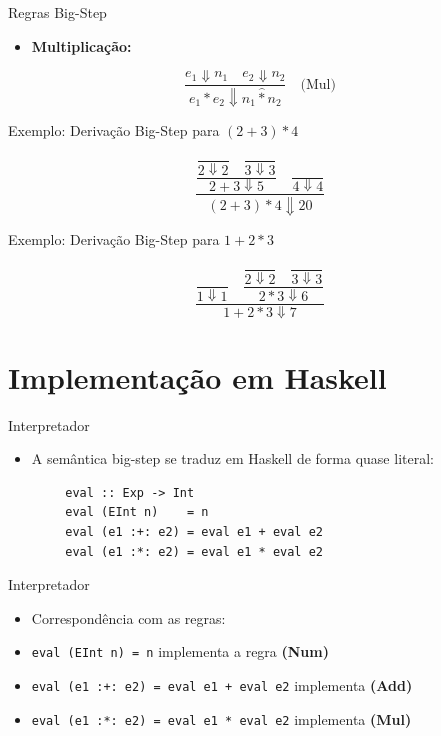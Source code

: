 \begin{frame}{Regras Big-Step}

    \begin{itemize}

        \item
        \textbf{Multiplicação:}
    \end{itemize}

    \[\frac{e_1 \Downarrow n_1 \quad e_2 \Downarrow n_2}{e_1 * e_2 \Downarrow n_1 \mathbin{\hat{*}} n_2} \quad \text{(Mul)}\]
\end{frame}

\begin{frame}{Exemplo: Derivação Big-Step para \((2 + 3) * 4\)}

    \[\dfrac{
    \dfrac{
    \dfrac{}{2 \Downarrow 2} \quad \dfrac{}{3 \Downarrow 3}
    }{2 + 3 \Downarrow 5}
    \quad
    \dfrac{}{4 \Downarrow 4}
    }{(2 + 3) * 4 \Downarrow 20}\]
\end{frame}

\begin{frame}{Exemplo: Derivação Big-Step para \(1 + 2 * 3\)}

    \[\dfrac{
    \dfrac{}{1 \Downarrow 1}
    \quad
    \dfrac{
    \dfrac{}{2 \Downarrow 2} \quad \dfrac{}{3 \Downarrow 3}
    }{2 * 3 \Downarrow 6}
    }{1 + 2 * 3 \Downarrow 7}\]
\end{frame}


\section{Implementação em
Haskell}\label{implementauxe7uxe3o-em-haskell}

\begin{frame}[fragile]{Interpretador}

    \begin{itemize}

        \item
        A semântica big-step se traduz em Haskell de forma quase literal:
    \end{itemize}

    \begin{lstlisting}
        eval :: Exp -> Int
        eval (EInt n)    = n
        eval (e1 :+: e2) = eval e1 + eval e2
        eval (e1 :*: e2) = eval e1 * eval e2
    \end{lstlisting}
\end{frame}

\begin{frame}[fragile]{Interpretador}

    \begin{itemize}
        \item
        Correspondência com as regras:
        \item
        \texttt{eval (EInt n) = n} implementa a regra
        \textbf{(Num)}
        \item
        \texttt{eval (e1 :+: e2) = eval e1 + eval e2}
        implementa \textbf{(Add)}
        \item
        \texttt{eval (e1 :*: e2) = eval e1 * eval e2}
        implementa \textbf{(Mul)}
    \end{itemize}
\end{frame}

